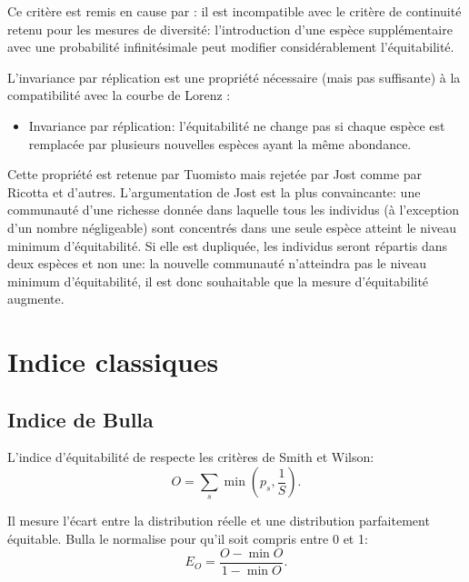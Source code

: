 \documentclass[
  11pt,
  french,
  a4paper,
  extrafontsizes,onecolumn,openright
  ]{memoir}
\providecommand{\tightlist}{%
  \setlength{\itemsep}{0pt}\setlength{\parskip}{0pt}}
\newlength{\rf}
\begin{document}
Ce critère est remis en cause par \textcite{Ricotta2004}: il est incompatible \autocite{Routledge1983} avec le critère de continuité retenu pour les mesures de diversité: l'introduction d'une espèce supplémentaire avec une probabilité infinitésimale peut modifier considérablement l'équitabilité.

L'invariance par réplication est une propriété nécessaire (mais pas suffisante) à la compatibilité avec la courbe de Lorenz \autocite{Ricotta2004}:

\begin{itemize}
\tightlist
\item
  Invariance par réplication: l'équitabilité ne change pas si chaque espèce est remplacée par plusieurs nouvelles espèces ayant la même abondance.
\end{itemize}

Cette propriété est retenue par Tuomisto mais rejetée par Jost comme par Ricotta et d'autres.
L'argumentation de Jost est la plus convaincante: une communauté d'une richesse donnée dans laquelle tous les individus (à l'exception d'un nombre négligeable) sont concentrés dans une seule espèce atteint le niveau minimum d'équitabilité.
Si elle est dupliquée, les individus seront répartis dans deux espèces et non une: la nouvelle communauté n'atteindra pas le niveau minimum d'équitabilité, il est donc souhaitable que la mesure d'équitabilité augmente.

\section{Indice classiques}\label{indice-classiques}

\subsection{Indice de Bulla}\label{indice-de-bulla}

L'indice d'équitabilité de \textcite{Bulla1994} respecte les critères de Smith et Wilson:
\begin{equation}
  \label{eq:Bulla}
  O = \sum_s{\min(p_s,\frac{1}{S})}.
\end{equation}

Il mesure l'écart entre la distribution réelle et une distribution parfaitement équitable.
Bulla le normalise pour qu'il soit compris entre 0 et 1:
\begin{equation}
  \label{eq:BullaNorm}
  E_O = \frac{O - \min{O}}{1 - \min{O}}.
\end{equation}
\end{document}

